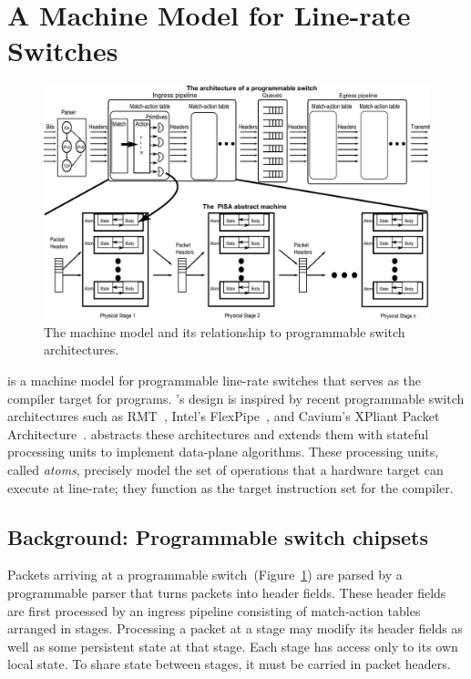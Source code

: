 \section{A Machine Model for Line-rate Switches}
\label{s:absmachine}

\begin{figure}[!t]
  \includegraphics[width=\textwidth]{pisa.pdf}
  \caption{The \absmachine machine model and its relationship to
  programmable switch architectures.}
  \label{fig:switch}
\end{figure}

\absmachine is a machine model for programmable line-rate switches
that serves as the compiler target for \pktlanguage programs.
\absmachine's design is inspired by recent programmable switch
architectures such as RMT~\cite{rmt}, Intel's
FlexPipe~\cite{flexpipe}, and Cavium's XPliant Packet
Architecture~\cite{xpliant}. \absmachine abstracts these architectures
and extends them with stateful processing units to implement
data-plane algorithms. These processing units, called {\em atoms},
precisely model the set of operations that a hardware target can
execute at line-rate; they function as the target instruction set for
the \pktlanguage compiler.

\subsection{Background: Programmable switch chipsets}
Packets arriving at a programmable switch~(Figure~\ref{fig:switch})
are parsed by a programmable parser that turns packets into header
fields. These header fields are first processed by an ingress pipeline
consisting of match-action tables arranged in stages. Processing a
packet at a stage may modify its header fields as well as some
persistent state at that stage. Each stage has access only to its own
local state. To share state between stages, it must be carried in
packet headers.

